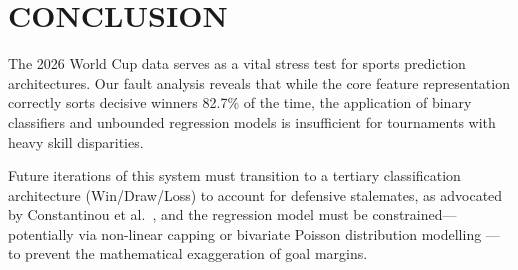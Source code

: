 \documentclass[a4paper,twoside]{article}
\begin{document}
\section{\uppercase{Conclusion}}
\label{sec:conclusion}

\noindent
The 2026 World Cup data serves as a vital stress test for sports prediction architectures. Our fault analysis reveals that while the core feature representation correctly sorts decisive winners 82.7\% of the time, the application of binary classifiers and unbounded regression models is insufficient for tournaments with heavy skill disparities. 

Future iterations of this system must transition to a tertiary classification architecture (Win/Draw/Loss) to account for defensive stalemates, as advocated by Constantinou et al.\ \cite{constantinou2012pi}, and the regression model must be constrained---potentially via non-linear capping or bivariate Poisson distribution modelling \cite{karlis2003analysis}---to prevent the mathematical exaggeration of goal margins.
\end{document}
